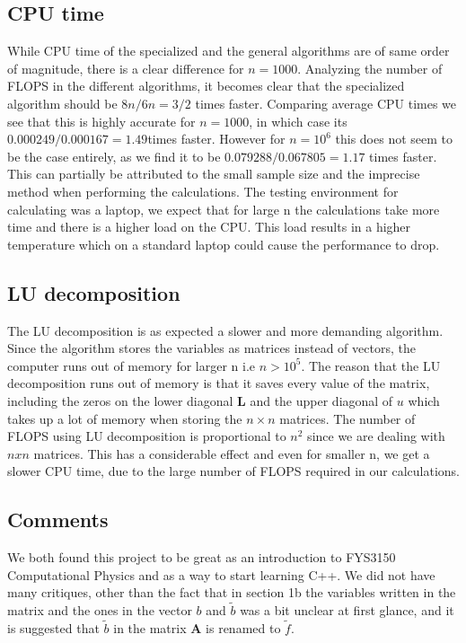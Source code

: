 \documentclass{emulateapj}
\begin{document}
\subsection{CPU time}
While CPU time of the specialized and the general algorithms are of same order of magnitude, there is a clear difference for $n = 1000$. Analyzing the number of FLOPS in the different algorithms, it becomes clear that the specialized algorithm should be $8n/6n = 3/2$ times faster. Comparing average CPU times we see that this is highly accurate for $n=1000$, in which case its $0.000249/0.000167 = 1.49$times faster. However for $n = 10^{6}$ this does not seem to be the case entirely, as we find it to be $0.079288/0.067805 = 1.17$ times faster. This can partially be attributed to the small sample size and the imprecise method when performing the calculations. The testing environment for calculating was a laptop, we expect that for large n the calculations take more time and there is a higher load on the CPU. This load results in a higher temperature which on a standard laptop could cause the performance to drop.

\subsection{LU decomposition}
The LU decomposition is as expected a slower and more demanding algorithm. Since the algorithm stores the variables as matrices instead of vectors, the computer runs out of memory for larger n i.e $n > 10^{5}$. The reason that the LU decomposition runs out of memory is that it saves every value of the matrix, including the zeros on the lower diagonal $\boldsymbol{L}$ and the upper diagonal of $u$ which takes up a lot of memory when storing the $n\times n$ matrices.
The number of FLOPS using LU decomposition is proportional to $n^{2}$ since we are dealing with $nxn$ matrices. This has a considerable effect and even for smaller n, we get a slower CPU time, due to the large number of FLOPS required in our calculations.

\subsection{Comments}
We both found this project to be great as an introduction to FYS3150 Computational Physics and as a way to start learning C++. We did not have many critiques, other than the fact that in section 1b the variables written in the matrix and the ones in the vector $b$ and $\tilde{b}$ was a bit unclear at first glance, and it is suggested that $\tilde{b}$ in the matrix $\boldsymbol{A}$ is renamed to $\tilde{f}$.
\end{document}
